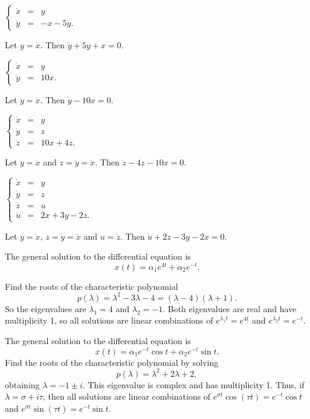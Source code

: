 \documentclass{ximera}
\begin{document}
 \ans $\left\{\begin{array}{rcl} \dot{x} & = & y \\
\dot{y} & = & -x-5y. \end{array}\right.$

\soln  Let $y = \dot{x}$.  Then $\dot{y}+5y+x=0$.


 \ans $\left\{\begin{array}{rcl} \dot{x} & = & y \\
\dot{y} & = & 10x. \end{array}\right.$

\soln  Let $y = \dot{x}$.  Then $\dot{y}-10x=0$.

\newpage
{} \ans $\left\{\begin{array}{rcl} \dot{x} & = & y \\
\dot{y} & = & z\\
\dot{z} & = & 10x+4z. \end{array}\right.$

\soln  Let $y = \dot{x}$ and $z=\dot{y}=\ddot{x}$.  Then 
$\dot{z}-4z-10x=0$.


 \ans $\left\{\begin{array}{rcl} \dot{x} & = & y \\
\dot{y} & = & z\\
\dot{z} & = & u\\
\dot{u} & = & 2x+3y-2z. \end{array}\right.$

\soln  Let $y = \dot{x}$, $z=\dot{y}=\ddot{x}$ and $u=\dot{z}$.  Then 
$\dot{u}+2z-3y-2x=0$.

 \ans The general solution to the differential equation is
\[
x(t) = \alpha_1e^{4t} + \alpha_2e^{-t}.
\]

\soln Find the roots of the characteristic polynomial
\[
p(\lambda) = \lambda^2 - 3\lambda - 4 = (\lambda - 4)(\lambda + 1).
\]
So the eigenvalues are $\lambda_1 = 4$ and $\lambda_2 = -1$.  Both eigenvalues
are real and have multiplicity 1, so all solutions are linear combinations of
$e^{\lambda_1 t} = e^{4t}$ and $e^{\lambda_2 t} = e^{-t}$.


 \ans The general solution to the differential equation is
\[
x(t) = \alpha_1e^{-t}\cos t + \alpha_2e^{-t}\sin t.
\]
\soln Find the roots of the characteristic polynomial by solving
\[
p(\lambda) = \lambda^2 + 2\lambda + 2,
\]
obtaining $\lambda = -1 \pm i$.  This eigenvalue is complex and has
multiplicity 1.  Thus, if $\lambda = \sigma + i\tau$, then all
solutions are linear combinations of $e^{\sigma t}\cos(\tau t) =
e^{-t}\cos t$ and $e^{\sigma t}\sin(\tau t) = e^{-t}\sin t$.
\end{document}
